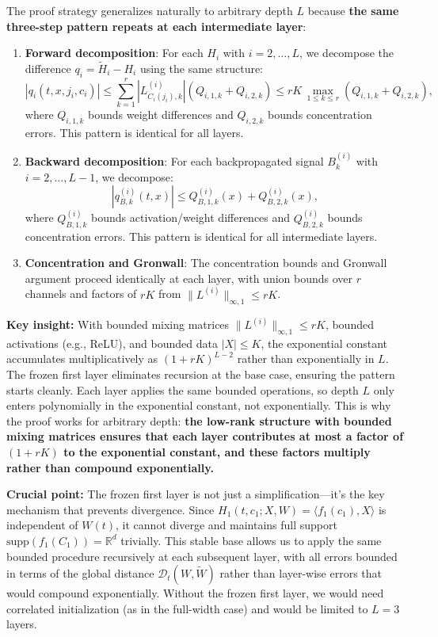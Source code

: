 \begin{remark}
\label{rem:generalization-L}
The proof strategy generalizes naturally to arbitrary depth $L$ because \textbf{the same three-step pattern repeats at each intermediate layer}:

\begin{enumerate}
\item \textbf{Forward decomposition}: For each $H_i$ with $i = 2, \ldots, L$, we decompose the difference $q_i = \tilde{H}_i - H_i$ using the same structure:
\[
|q_i(t, x, j_i, c_i)| \le \sum_{k=1}^r |L^{(i)}_{C_i(j_i),k}|(Q_{i,1,k} + Q_{i,2,k}) \le rK\,\max_{1 \le k \le r}(Q_{i,1,k} + Q_{i,2,k}),
\]
where $Q_{i,1,k}$ bounds weight differences and $Q_{i,2,k}$ bounds concentration errors. This pattern is identical for all layers.

\item \textbf{Backward decomposition}: For each backpropagated signal $B_k^{(i)}$ with $i = 2, \ldots, L-1$, we decompose:
\[
|q_{B,k}^{(i)}(t, x)| \le Q_{B,1,k}^{(i)}(x) + Q_{B,2,k}^{(i)}(x),
\]
where $Q_{B,1,k}^{(i)}$ bounds activation/weight differences and $Q_{B,2,k}^{(i)}$ bounds concentration errors. This pattern is identical for all intermediate layers.

\item \textbf{Concentration and Gronwall}: The concentration bounds and Gronwall argument proceed identically at each layer, with union bounds over $r$ channels and factors of $rK$ from $\|L^{(i)}\|_{\infty,1} \le rK$.
\end{enumerate}

\textbf{Key insight:} With bounded mixing matrices $\|L^{(i)}\|_{\infty,1} \le rK$, bounded activations (e.g., ReLU), and bounded data $|X| \le K$, the exponential constant accumulates multiplicatively as $(1+rK)^{L-2}$ rather than exponentially in $L$. The frozen first layer eliminates recursion at the base case, ensuring the pattern starts cleanly. Each layer applies the same bounded operations, so depth $L$ only enters polynomially in the exponential constant, not exponentially. This is why the proof works for arbitrary depth: \textbf{the low-rank structure with bounded mixing matrices ensures that each layer contributes at most a factor of $(1+rK)$ to the exponential constant, and these factors multiply rather than compound exponentially.}

\textbf{Crucial point:} The frozen first layer is not just a simplification—it's the key mechanism that prevents divergence. Since $H_1(t, c_1; X, W) = \langle f_1(c_1), X\rangle$ is independent of $W(t)$, it cannot diverge and maintains full support $\text{supp}(f_1(C_1)) = \mathbb{R}^d$ trivially. This stable base allows us to apply the same bounded procedure recursively at each subsequent layer, with all errors bounded in terms of the global distance $\mathscr{D}_t(W, \tilde{W})$ rather than layer-wise errors that would compound exponentially. Without the frozen first layer, we would need correlated initialization (as in the full-width case) and would be limited to $L=3$ layers.
\end{remark}

